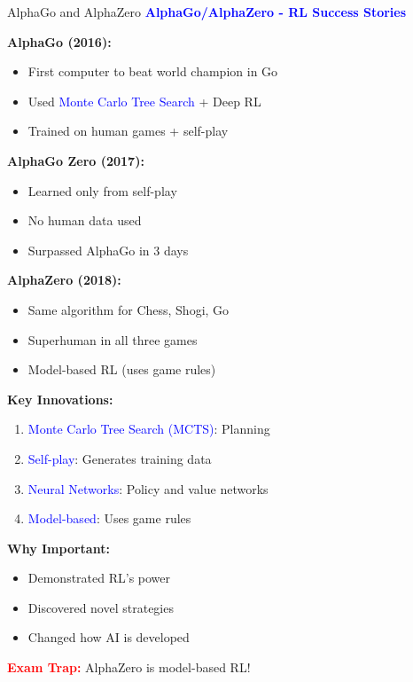 \documentclass[8pt]{beamer}
\begin{document}
\begin{frame}{AlphaGo and AlphaZero}
\fontsize{6.5}{7.5}\selectfont
\textcolor{blue}{\textbf{AlphaGo/AlphaZero - RL Success Stories}}

\textbf{AlphaGo (2016):}
\begin{itemize}
\item First computer to beat world champion in Go
\item Used \textcolor{blue}{Monte Carlo Tree Search} + Deep RL
\item Trained on human games + self-play
\end{itemize}

\textbf{AlphaGo Zero (2017):}
\begin{itemize}
\item Learned only from self-play
\item No human data used
\item Surpassed AlphaGo in 3 days
\end{itemize}

\textbf{AlphaZero (2018):}
\begin{itemize}
\item Same algorithm for Chess, Shogi, Go
\item Superhuman in all three games
\item Model-based RL (uses game rules)
\end{itemize}

\textbf{Key Innovations:}
\begin{enumerate}
\item \textcolor{blue}{Monte Carlo Tree Search (MCTS)}: Planning
\item \textcolor{blue}{Self-play}: Generates training data
\item \textcolor{blue}{Neural Networks}: Policy and value networks
\item \textcolor{blue}{Model-based}: Uses game rules
\end{enumerate}

\textbf{Why Important:}
\begin{itemize}
\item Demonstrated RL's power
\item Discovered novel strategies
\item Changed how AI is developed
\end{itemize}

\textcolor{red}{\textbf{Exam Trap:}} AlphaZero is model-based RL!
\end{frame}
\end{document}
